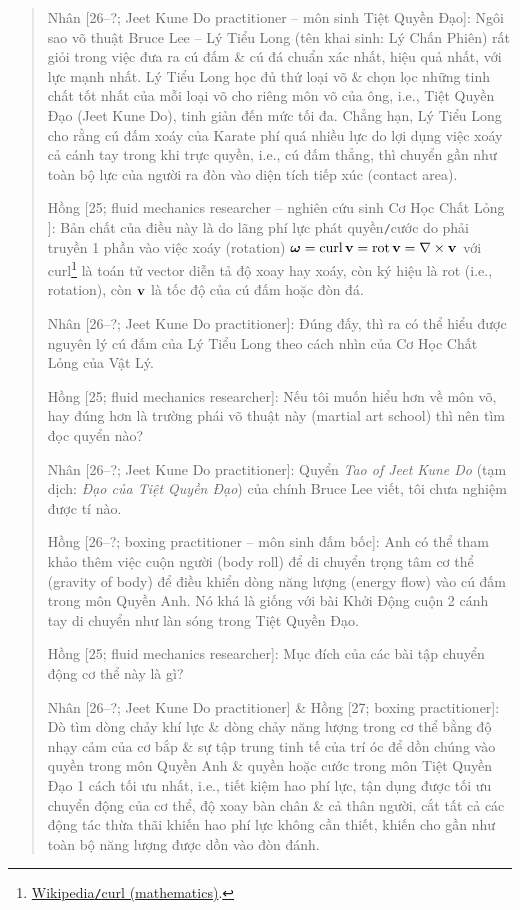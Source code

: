 \documentclass[12pt]{article}
\begin{document}
\begin{quotation}
	{\sf Nhân [26--?; Jeet Kune Do practitioner -- môn sinh Tiệt Quyền Đạo]}: Ngôi sao võ thuật {\sc Bruce Lee -- Lý Tiểu Long} (tên khai sinh: {\sc Lý Chấn Phiên}) rất giỏi trong việc đưa ra cú đấm \& cú đá chuẩn xác nhất, hiệu quả nhất, với lực mạnh nhất. {\sc Lý Tiểu Long} học đủ thứ loại võ \& chọn lọc những tinh chất tốt nhất của mỗi loại võ cho riêng môn võ của ông, i.e., Tiệt Quyền Đạo (Jeet Kune Do), tinh giản đến mức tối đa. Chẳng hạn, {\sc Lý Tiểu Long} cho rằng cú đấm xoáy của Karate phí quá nhiều lực do lợi dụng việc xoáy cả cánh tay trong khi trực quyền, i.e., cú đấm thẳng, thì chuyển gần như toàn bộ lực của người ra đòn vào diện tích tiếp xúc (contact area).
	
	{\sf Hồng [25; fluid mechanics researcher -- nghiên cứu sinh Cơ Học Chất Lỏng ]}: Bản chất của điều này là do lãng phí lực phát quyền{\tt/}cước do phải truyền 1 phần vào việc xoáy (rotation) $\boldsymbol{\omega} = \operatorname{curl}{\bf v} = \operatorname{rot}{\bf v} = \nabla\times{\bf v}$ với curl\footnote{\href{https://en.wikipedia.org/wiki/Curl_(mathematics)}{Wikipedia{\tt/}curl (mathematics)}.} là toán tử vector diễn tả độ xoay hay xoáy, còn ký hiệu là rot (i.e., rotation), còn ${\bf v}$ là tốc độ của cú đấm hoặc đòn đá.
	
	{\sf Nhân [26--?; Jeet Kune Do practitioner]}: Đúng đấy, thì ra có thể hiểu được nguyên lý cú đấm của {\sc Lý Tiểu Long} theo cách nhìn của Cơ Học Chất Lỏng của Vật Lý.
	
	{\sf Hồng [25; fluid mechanics researcher]}: Nếu tôi muốn hiểu hơn về môn võ, hay đúng hơn là trường phái võ thuật này (martial art school) thì nên tìm đọc quyển nào?
	
	{\sf Nhân [26--?; Jeet Kune Do practitioner]}: Quyển {\it Tao of Jeet Kune Do} \cite{Lee2011} (tạm dịch: {\it Đạo của Tiệt Quyền Đạo}) của chính {\sc Bruce Lee} viết, tôi chưa nghiệm được tí nào.
	
	{\sf Hồng [26--?; boxing practitioner -- môn sinh đấm bốc]}: Anh có thể tham khảo thêm việc cuộn người (body roll) để di chuyển trọng tâm cơ thể (gravity of body) để điều khiển dòng năng lượng (energy flow) vào cú đấm trong môn Quyền Anh. Nó khá là giống với bài Khởi Động cuộn 2 cánh tay di chuyển như làn sóng trong Tiệt Quyền Đạo.
	
	{\sf Hồng [25; fluid mechanics researcher]}: Mục đích của các bài tập chuyển động cơ thể này là gì?
	
	{\sf Nhân [26--?; Jeet Kune Do practitioner] \& Hồng [27; boxing practitioner]}: Dò tìm dòng chảy khí lực \& dòng chảy năng lượng trong cơ thể bằng độ nhạy cảm của cơ bắp \& sự tập trung tinh tế của trí óc để dồn chúng vào quyền trong môn Quyền Anh \& quyền hoặc cước trong môn Tiệt Quyền Đạo 1 cách tối ưu nhất, i.e., tiết kiệm hao phí lực, tận dụng được tối ưu chuyển động của cơ thể, độ xoay bàn chân \& cả thân người, cắt tất cả các động tác thừa thãi khiến hao phí lực không cần thiết, khiến cho gần như toàn bộ năng lượng được dồn vào đòn đánh.
	

\end{quotation}
\end{document}
